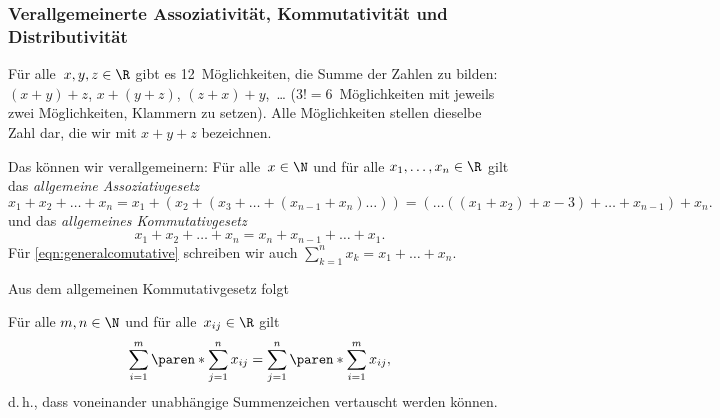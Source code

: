 \documentclass[a4paper]{article}
\begin{document}
\subsubsection{Verallgemeinerte Assoziativität, Kommutativität und Distributivität}

\begin{remark}
    Für alle~$x, y, z \in \R$ gibt es 12~Möglichkeiten, die Summe der Zahlen zu bilden: $(x + y) + z$, $x + (y + z)$, $(z + x) + y$,~\dots{} ($3! = 6$~Möglichkeiten mit jeweils zwei Möglichkeiten, Klammern zu setzen). Alle Möglichkeiten stellen dieselbe Zahl dar, die wir mit $x + y + z$ bezeichnen.

    Das können wir verallgemeinern: Für alle~$x \in \N$ und für alle $x_1, \dots, x_n \in \R$ gilt das \emph{allgemeine Assoziativgesetz}
    \begin{equation*}
        x_1 + x_2 + \dots + x_n = x_1 + (x_2 + (x_3 + \dots + (x_{n-1} + x_n) \dots )) = ( \dots ((x_1 + x_2) + x-3) + \dots + x_{n-1}) + x_n.
    \end{equation*}
    und das \emph{allgemeines Kommutativgesetz}
    \begin{equation}
        x_1 + x_2 + \dots + x_n = x_n + x_{n-1} + \dots + x_1. \label{eqn:generalcomutative}
    \end{equation}
    Für \cref{eqn:generalcomutative} schreiben wir auch $\sum_{k=1}^n x_k = x_1 + \dots + x_n$.
\end{remark}

Aus dem allgemeinen Kommutativgesetz folgt
\begin{theorem}[Doppelsumme]
    Für alle $m, n \in \N$ und für alle~$x_{ij} \in \R$ gilt
    \begin{equation*}
        \sum_{i=1}^m \paren*{\sum_{j=1}^n x_{ij}} = \sum_{j=1}^n \paren*{\sum_{i=1}^m x_{ij}},
    \end{equation*}
    d.\,h., dass voneinander unabhängige Summenzeichen vertauscht werden können.
\end{theorem}
\end{document}
